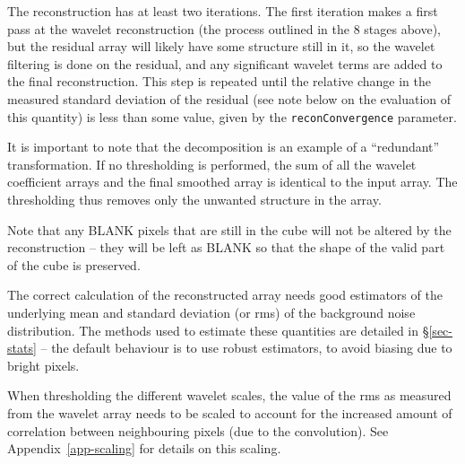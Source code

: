 The reconstruction has at least two iterations. The first iteration
makes a first pass at the wavelet reconstruction (the process outlined
in the 8 stages above), but the residual array will likely have some
structure still in it, so the wavelet filtering is done on the
residual, and any significant wavelet terms are added to the final
reconstruction. This step is repeated until the relative change in the
measured standard deviation of the residual (see note below on the
evaluation of this quantity) is less than some value, given by the
\texttt{reconConvergence} parameter.

It is important to note that the \atrous decomposition is an example
of a ``redundant'' transformation. If no thresholding is performed,
the sum of all the wavelet coefficient arrays and the final smoothed
array is identical to the input array. The thresholding thus removes
only the unwanted structure in the array.

Note that any BLANK pixels that are still in the cube will not be
altered by the reconstruction -- they will be left as BLANK so that
the shape of the valid part of the cube is preserved.


The correct calculation of the reconstructed array needs good
estimators of the underlying mean and standard deviation (or rms) of
the background noise distribution. The methods used to estimate these
quantities are detailed in \S\ref{sec-stats} -- the default behaviour
is to use robust estimators, to avoid biasing due to bright pixels.


When thresholding the different wavelet scales, the value of the rms
as measured from the wavelet array needs to be scaled to account for
the increased amount of correlation between neighbouring pixels (due
to the convolution). See Appendix~\ref{app-scaling} for details on
this scaling.

